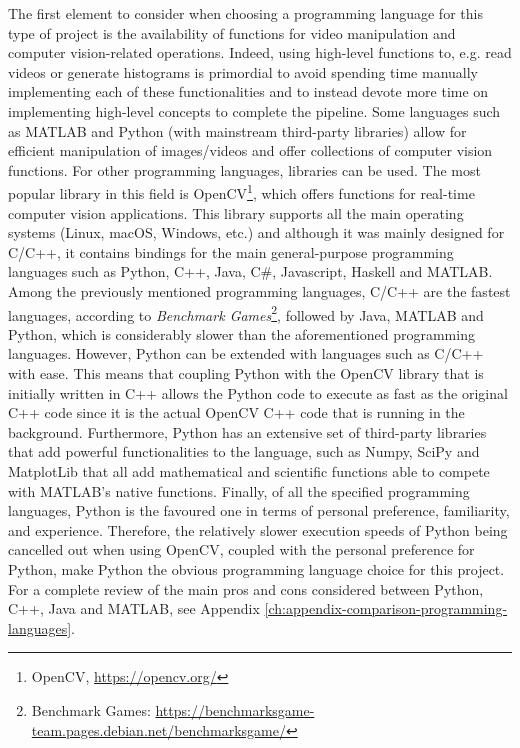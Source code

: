 The first element to consider when choosing a programming language for this type of project is the availability of functions for video manipulation and computer vision-related operations. Indeed, using high-level functions to, e.g. read videos or generate histograms is primordial to avoid spending time manually implementing each of these functionalities and to instead devote more time on implementing high-level concepts to complete the pipeline. Some languages such as MATLAB and Python (with mainstream third-party libraries) allow for efficient manipulation of images/videos and offer collections of computer vision functions. For other programming languages, libraries can be used. The most popular library in this field is OpenCV\footnote{OpenCV, \url{https://opencv.org/}}, which offers functions for real-time computer vision applications. This library supports all the main operating systems (Linux, macOS, Windows, etc.) and although it was mainly designed for C/C++, it contains bindings for the main general-purpose programming languages such as Python, C++, Java, C\#, Javascript, Haskell and MATLAB.\\

Among the previously mentioned programming languages, C/C++ are the fastest languages,
according to \textit{Benchmark Games}\footnote{Benchmark Games: \url{https://benchmarksgame-team.pages.debian.net/benchmarksgame/}}, followed by Java, MATLAB and Python, which is considerably slower than the aforementioned programming languages. However, Python can be extended with languages such as C/C++ with ease. This means that coupling Python with the OpenCV library that is initially written in C++ allows the Python code to execute as fast as the original C++ code since it is the actual OpenCV C++ code that is running in the background. Furthermore, Python has an extensive set of third-party libraries that add powerful functionalities to the language, such as Numpy, SciPy and MatplotLib that all add mathematical and scientific functions able to compete with MATLAB's native functions. Finally, of all the specified programming languages, Python is the favoured one in terms of personal preference, familiarity, and experience. Therefore, the relatively slower execution speeds of Python being cancelled out when using OpenCV, coupled with the personal preference for Python, make Python the obvious programming language choice for this project. For a complete review of the main pros and cons considered between Python, C++, Java and MATLAB, see Appendix \ref{ch:appendix-comparison-programming-languages}.

